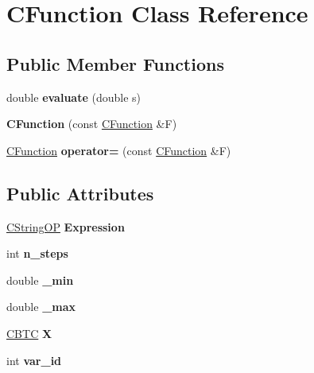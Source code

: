 \hypertarget{class_c_function}{}\section{C\+Function Class Reference}
\label{class_c_function}
\subsection*{Public Member Functions}
\begin{DoxyCompactItemize}
\item 
\mbox{\label{class_c_function_adf3f54215c9608252770b1f0b449e926}} 
double {\bfseries evaluate} (double s)
\item 
\mbox{\label{class_c_function_a1fc0884ef1a7aa04178de140609eb957}} 
{\bfseries C\+Function} (const \hyperlink{class_c_function}{C\+Function} \&F)
\item 
\mbox{\label{class_c_function_a11c5e38cebe7cd3e66aada63d3dde6ab}} 
\hyperlink{class_c_function}{C\+Function} {\bfseries operator=} (const \hyperlink{class_c_function}{C\+Function} \&F)
\end{DoxyCompactItemize}
\subsection*{Public Attributes}
\begin{DoxyCompactItemize}
\item 
\mbox{\label{class_c_function_a80ddd30ebd0789d8920435679395fa8c}} 
\hyperlink{class_c_string_o_p}{C\+String\+OP} {\bfseries Expression}
\item 
\mbox{\label{class_c_function_a4171349ac85479b04f25913ac73da610}} 
int {\bfseries n\+\_\+steps}
\item 
\mbox{\label{class_c_function_a833444370079bc550270dc134ecd8264}} 
double {\bfseries \+\_\+min}
\item 
\mbox{\label{class_c_function_a9e3e12ed9fbb119e72af58b26bac46e7}} 
double {\bfseries \+\_\+max}
\item 
\mbox{\label{class_c_function_a4ee57f62d14949fe60a83c5cad928606}} 
\hyperlink{class_c_b_t_c}{C\+B\+TC} {\bfseries X}
\item 
\mbox{\label{class_c_function_acdfc693cc21479f8873a4206c5ebdabc}} 
int {\bfseries var\+\_\+id}
\end{DoxyCompactItemize}


